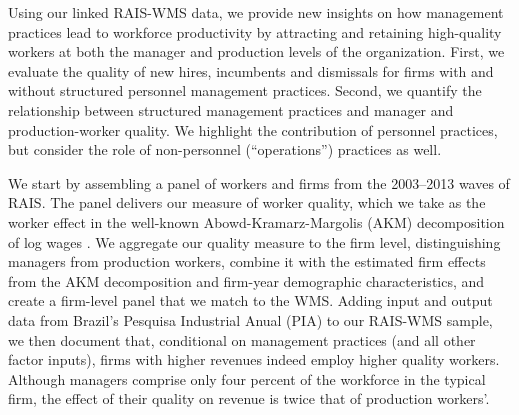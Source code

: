Using our linked RAIS-WMS data, we provide new insights on how management practices lead to workforce productivity by attracting and retaining high-quality workers at both the manager and production levels of the organization.  First, we evaluate the quality of new hires, incumbents and dismissals for firms with and without structured personnel management practices. Second, we quantify the relationship between structured management practices and manager and production-worker quality. We highlight the contribution of personnel practices, but consider the role of non-personnel (``operations'') practices as well.  

We start by assembling a panel of workers and firms from the 2003–2013 waves of RAIS. The panel delivers our measure of worker quality, which we take as the worker effect in the well-known Abowd-Kramarz-Margolis (AKM) decomposition  of log wages \citep{Abowd1999}. We aggregate our quality measure to the firm level, distinguishing managers from production workers, combine it with the estimated firm effects from the AKM decomposition and firm-year demographic characteristics, and create a firm-level panel that we match to the WMS. Adding input and output data from Brazil's Pesquisa Industrial Anual (PIA) to our RAIS-WMS sample, we then document that, conditional on management practices (and all other factor inputs), firms with higher revenues indeed employ higher quality workers. Although managers comprise only four percent of the workforce in the typical firm, the effect of their quality on revenue is twice that of production workers'.


